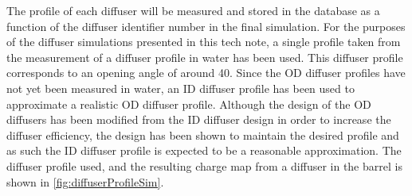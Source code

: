 \documentclass[a4paper,11pt]{article}
\begin{document}
The profile of each diffuser will be measured and stored in the database as a function of the diffuser identifier number in the final simulation. For the purposes of the diffuser simulations presented in this tech note, a single profile taken from the measurement of a diffuser profile in water has been used. This diffuser profile corresponds to an opening angle of around 40\textdegree. Since the OD diffuser profiles have not yet been measured in water, an ID diffuser profile has been used to approximate a realistic OD diffuser profile. Although the design of the OD diffusers has been modified from the ID diffuser design in order to increase the diffuser efficiency, the design has been shown to maintain the desired profile and as such the ID diffuser profile is expected to be a reasonable approximation. The diffuser profile used, and the resulting charge map from a diffuser in the barrel is shown in \cref{fig:diffuserProfileSim}.
\end{document}
